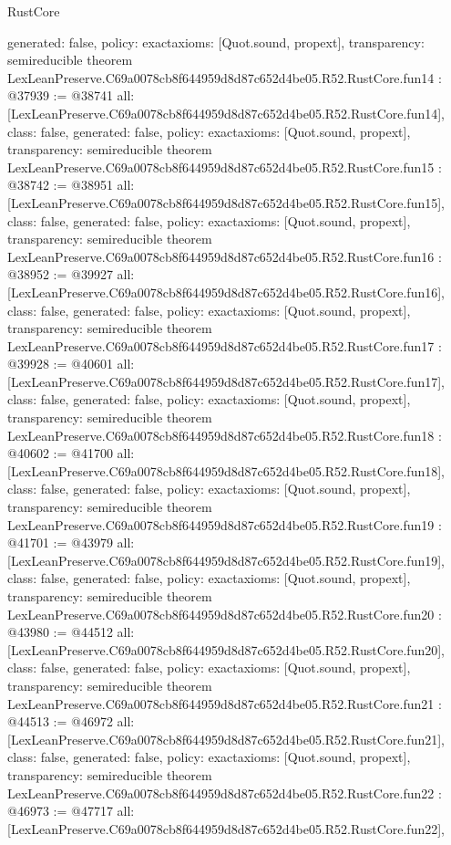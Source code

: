 \begin{lexlean}{RustCore}
\begin{coremodule}
{  generated: false,
  policy: exact{axioms: [Quot.sound, propext]},
  transparency: semireducible
}
theorem LexLeanPreserve.C69a0078cb8f644959d8d87c652d4be05.R52.RustCore.fun14 : @37939 := @38741 {
  all: [LexLeanPreserve.C69a0078cb8f644959d8d87c652d4be05.R52.RustCore.fun14],
  class: false,
  generated: false,
  policy: exact{axioms: [Quot.sound, propext]},
  transparency: semireducible
}
theorem LexLeanPreserve.C69a0078cb8f644959d8d87c652d4be05.R52.RustCore.fun15 : @38742 := @38951 {
  all: [LexLeanPreserve.C69a0078cb8f644959d8d87c652d4be05.R52.RustCore.fun15],
  class: false,
  generated: false,
  policy: exact{axioms: [Quot.sound, propext]},
  transparency: semireducible
}
theorem LexLeanPreserve.C69a0078cb8f644959d8d87c652d4be05.R52.RustCore.fun16 : @38952 := @39927 {
  all: [LexLeanPreserve.C69a0078cb8f644959d8d87c652d4be05.R52.RustCore.fun16],
  class: false,
  generated: false,
  policy: exact{axioms: [Quot.sound, propext]},
  transparency: semireducible
}
theorem LexLeanPreserve.C69a0078cb8f644959d8d87c652d4be05.R52.RustCore.fun17 : @39928 := @40601 {
  all: [LexLeanPreserve.C69a0078cb8f644959d8d87c652d4be05.R52.RustCore.fun17],
  class: false,
  generated: false,
  policy: exact{axioms: [Quot.sound, propext]},
  transparency: semireducible
}
theorem LexLeanPreserve.C69a0078cb8f644959d8d87c652d4be05.R52.RustCore.fun18 : @40602 := @41700 {
  all: [LexLeanPreserve.C69a0078cb8f644959d8d87c652d4be05.R52.RustCore.fun18],
  class: false,
  generated: false,
  policy: exact{axioms: [Quot.sound, propext]},
  transparency: semireducible
}
theorem LexLeanPreserve.C69a0078cb8f644959d8d87c652d4be05.R52.RustCore.fun19 : @41701 := @43979 {
  all: [LexLeanPreserve.C69a0078cb8f644959d8d87c652d4be05.R52.RustCore.fun19],
  class: false,
  generated: false,
  policy: exact{axioms: [Quot.sound, propext]},
  transparency: semireducible
}
theorem LexLeanPreserve.C69a0078cb8f644959d8d87c652d4be05.R52.RustCore.fun20 : @43980 := @44512 {
  all: [LexLeanPreserve.C69a0078cb8f644959d8d87c652d4be05.R52.RustCore.fun20],
  class: false,
  generated: false,
  policy: exact{axioms: [Quot.sound, propext]},
  transparency: semireducible
}
theorem LexLeanPreserve.C69a0078cb8f644959d8d87c652d4be05.R52.RustCore.fun21 : @44513 := @46972 {
  all: [LexLeanPreserve.C69a0078cb8f644959d8d87c652d4be05.R52.RustCore.fun21],
  class: false,
  generated: false,
  policy: exact{axioms: [Quot.sound, propext]},
  transparency: semireducible
}
theorem LexLeanPreserve.C69a0078cb8f644959d8d87c652d4be05.R52.RustCore.fun22 : @46973 := @47717 {
  all: [LexLeanPreserve.C69a0078cb8f644959d8d87c652d4be05.R52.RustCore.fun22],
}
\end{coremodule}
\end{lexlean}
